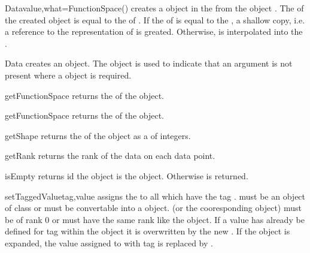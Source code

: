 \begin{classdesc}{Data}{value,what=FunctionSpace()}
creates a \Data object in the \FunctionSpace {} from the \Data object .
The \Shape of the created \Data object is equal to the \Shape of .
If the \FunctionSpace of  is equal to the , a shallow copy, i.e.
a reference to the representation of  is greated. Otherwise,
 is interpolated into the . 
\end{classdesc}

\begin{classdesc}{Data}{}
creates an \EmptyData object. The \EmptyData object is used to indicate that an argument is not present
where a \Data object is required.
\end{classdesc}

\begin{methoddesc}[Data]{getFunctionSpace}{}
returns the \FunctionSpace of the object.
\end{methoddesc}

\begin{methoddesc}[Data]{getFunctionSpace}{}
returns the \Domain  of the object.
\end{methoddesc}

\begin{methoddesc}[Data]{getShape}{}
returns the \Shape  of the object as a  of
integers.
\end{methoddesc}

\begin{methoddesc}[Data]{getRank}{}
returns the rank of the data on each data point. 
\end{methoddesc}

\begin{methoddesc}[Data]{isEmpty}{}
returns \True id the \Data object is the \EmptyData object.
Otherwise \False is returned.
\end{methoddesc}

\begin{methoddesc}[Data]{setTaggedValue}{tag,value}
assigns the  to all \DataSamplePoints which have the tag
.  must be an object of class
 or must be convertable into a
 object.  (or the cooresponding
 object) must be of rank $0$ or must have the
same rank like the object.
If a value has already be defined for tag  within the object
it is overwritten by the new .  If the object is expanded,
the value assigned to \DataSamplePoints with tag  is replaced by
.
\end{methoddesc}

